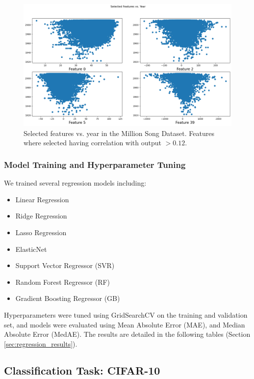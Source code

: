 \documentclass[twocolumn]{article}
\begin{document}
\begin{figure}[h]
    \centering
    \includegraphics[width=0.95\linewidth]{images/songs/correlation_best_features.png}
    \caption{Selected features vs. year in the Million Song Dataset. Features where selected having 
    correlation with output $> 0.12$.}
    \label{fig:correlation_features}
\end{figure}

\subsubsection{Model Training and Hyperparameter Tuning}
We trained several regression models including:
\begin{itemize}
    \item Linear Regression
    \item Ridge Regression
    \item Lasso Regression
    \item ElasticNet
    \item Support Vector Regressor (SVR)
    \item Random Forest Regressor (RF)
    \item Gradient Boosting Regressor (GB)
\end{itemize}

Hyperparameters were tuned using GridSearchCV on the training and validation set,
 and models were evaluated using Mean Absolute Error (MAE), and Median Absolute Error (MedAE). 
 The results are detailed in the following tables (Section \ref{sec:regression_results}).

\subsection{Classification Task: CIFAR-10}
\end{document}
